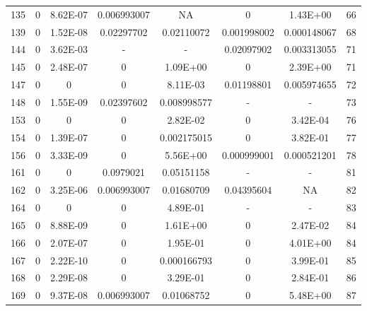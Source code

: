 {\begin{longtable}{cccccccc}
135 & {\color{red}0} & {\color{red}8.62E-07} & {\color{red}0.006993007} & NA & {\color{red}0} & {\color{red}1.43E+00} & 66 \\
139 & {\color{red}0} & {\color{red}1.52E-08} & {\color{red}0.02297702} & {\color{red}0.02110072} & {\color{red}0.001998002} & {\color{red}0.000148067} & 68 \\
144 & {\color{red}0} & {\color{red}3.62E-03} & - & - & {\color{red}0.02097902} & {\color{red}0.003313055} & 71 \\
145 & {\color{red}0} & {\color{red}2.48E-07} & {\color{red}0} & 1.09E+00 & {\color{red}0} & 2.39E+00 & 71 \\
147 & {\color{red}0} & {\color{red}0} & {\color{red}0} & {\color{red}8.11E-03} & {\color{red}0.01198801} & {\color{red}0.005974655} & 72 \\
148 & {\color{red}0} & {\color{red}1.55E-09} & {\color{red}0.02397602} & {\color{red}0.008998577} & - & - & 73 \\
153 & {\color{red}0} & {\color{red}0} & {\color{red}0} & {\color{red}2.82E-02} & {\color{red}0} & {\color{red}3.42E-04} & 76 \\
154 & {\color{red}0} & {\color{red}1.39E-07} & {\color{red}0} & {\color{red}0.002175015} & {\color{red}0} & 3.82E-01 & 77 \\
156 & {\color{red}0} & {\color{red}3.33E-09} & {\color{red}0} & 5.56E+00 & {\color{red}0.000999001} & {\color{red}0.000521201} & 78 \\
161 & {\color{red}0} & {\color{red}0} & 0.0979021 & 0.05151158 & - & - & 81 \\
162 & {\color{red}0} & {\color{red}3.25E-06} & {\color{red}0.006993007} & {\color{red}0.01680709} & {\color{red}0.04395604} & NA & 82 \\
164 & {\color{red}0} & {\color{red}0} & {\color{red}0} & 4.89E-01 & - & - & 83 \\
165 & {\color{red}0} & {\color{red}8.88E-09} & {\color{red}0} & 1.61E+00 & {\color{red}0} & {\color{red}2.47E-02} & 84 \\
166 & {\color{red}0} & {\color{red}2.07E-07} & {\color{red}0} & 1.95E-01 & {\color{red}0} & 4.01E+00 & 84 \\
167 & {\color{red}0} & {\color{red}2.22E-10} & {\color{red}0} & {\color{red}0.000166793} & {\color{red}0} & 3.99E-01 & 85 \\
168 & {\color{red}0} & {\color{red}2.29E-08} & {\color{red}0} & 3.29E-01 & {\color{red}0} & 2.84E-01 & 86 \\
169 & {\color{red}0} & {\color{red}9.37E-08} & {\color{red}0.006993007} & {\color{red}0.01068752} & {\color{red}0} & 5.48E+00 & 87 \\

\end{longtable}}
